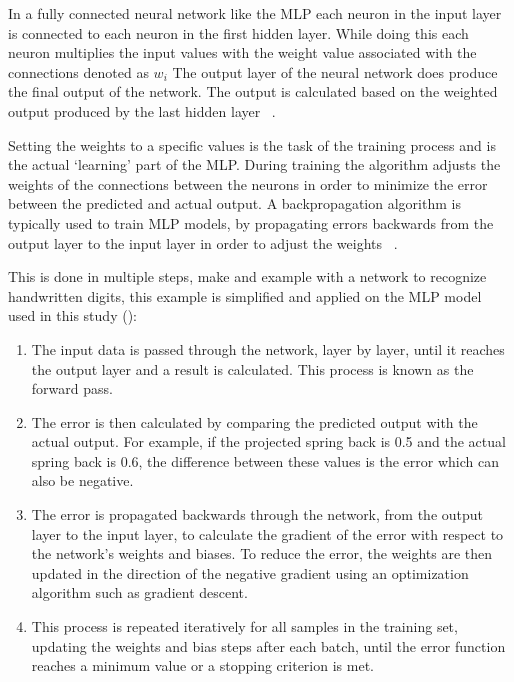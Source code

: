 In a fully connected neural network like the MLP each neuron in the input layer is connected to each neuron in the
first hidden layer.
While doing this each neuron multiplies the input values with the weight value associated with the connections
denoted as $w_i$
The output layer of the neural network does produce the final output of the network.
The output is calculated based on the weighted output produced by the last hidden layer
~\cite[p. 106]{muller2016introduction}.

Setting the weights to a specific values is the task of the training process and is the actual `learning' part of the
MLP.
During training the algorithm adjusts the weights of the connections between the neurons in order to minimize
the error between the predicted and actual output.
A backpropagation algorithm is typically used to train \ac{MLP} models, by
propagating errors backwards from the output layer to the input layer in order to adjust
the weights
~\cite[p. 454]{taud2018multilayer}.

This is done in multiple steps, \cite{nielsen2015neural} make and example with a network to recognize
handwritten digits, this example is simplified and applied on the MLP model used in this study
(\cite[p. 12--24]{nielsen2015neural}):

\begin{enumerate}
    \item The input data is passed through the network, layer by layer, until it reaches the output layer and a
    result is calculated.
    This process is known as the forward pass.
    \item The error is then calculated by comparing the predicted output with the actual output.
    For example, if the projected spring back is 0.5 and the actual spring back is 0.6, the difference between these
    values is the error which can also be negative.
    \item The error is propagated backwards through the network, from the output layer to the input layer, to
    calculate the gradient of the error with respect to the network's weights and biases. To reduce the error,
    the weights are then updated in the direction of the negative gradient using an optimization algorithm such
    as gradient descent.
    \item This process is repeated iteratively for all
    samples in the training set, updating the weights and bias steps after each batch, until the error function
    reaches a minimum value or a stopping criterion is met.
\end{enumerate}

